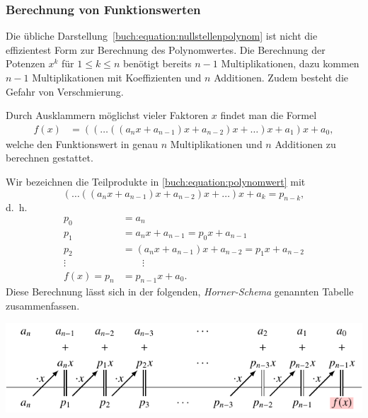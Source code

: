 \subsubsection{Berechnung von Funktionswerten}
Die übliche Darstellung~\eqref{buch:equation:nullstellenpolynom}
ist nicht die effizientest Form zur Berechnung des Polynomwertes.
Die Berechnung der Potenzen $x^k$ für $1\le k\le n$ benötigt bereits
$n-1$ Multiplikationen, dazu kommen $n-1$ Multiplikationen mit
Koeffizienten und $n$ Additionen.
Zudem besteht die Gefahr von Verschmierung.

Durch Ausklammern möglichst vieler Faktoren $x$ findet man die
Formel
\begin{align}
f(x)
&=
((\dots((a_nx+a_{n-1})x+a_{n-2})x+\dots)x+a_1)x+a_0,
\label{buch:equation:polynomwert}
\end{align}
welche den Funktionswert in genau $n$ Multiplikationen und $n$ Additionen
zu berechnen gestattet.

Wir bezeichnen die Teilprodukte in \eqref{buch:equation:polynomwert}
mit
\[
(\dots((a_nx+a_{n-1})x+a_{n-2})x+\dots)x+a_k
=
p_{n-k},
\]
d.~h.
\begin{equation}
\begin{aligned}
p_0 &= a_n
\\
p_1 &= a_nx+a_{n-1} = p_0x + a_{n-1}
\\
p_2 &= (a_nx+a_{n-1})x+a_{n-2} = p_1x+a_{n-2}
\\
\vdots\;&\qquad\vdots
\\
f(x)
=
p_n
&=
p_{n-1}x+a_0.
\end{aligned}
\label{buch:equation:reste}
\end{equation}
Diese Berechnung lässt sich in der folgenden, {\em Horner-Schema}
genannten Tabelle
zusammenfassen.
\begin{center}
\includegraphics{chapters/20-gleichungen/figures/horner1.pdf}
\end{center}

